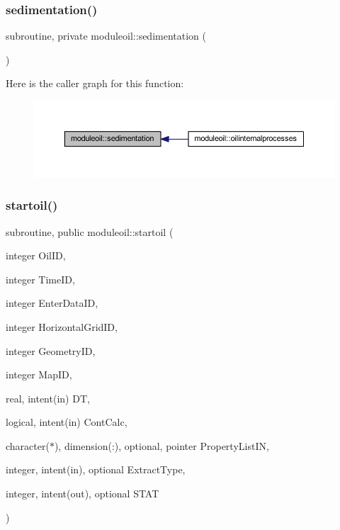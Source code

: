 \mbox{\label{namespacemoduleoil_a9a79912febfdb0e994ca0e98a2f342bc}} 
\subsubsection{\texorpdfstring{sedimentation()}{sedimentation()}}
{\footnotesize\ttfamily subroutine, private moduleoil\+::sedimentation (\begin{DoxyParamCaption}{ }\end{DoxyParamCaption})\hspace{0.3cm}{\ttfamily [private]}}

Here is the caller graph for this function\+:\nopagebreak
\begin{figure}[H]
\begin{center}
\leavevmode
\includegraphics[width=350pt]{namespacemoduleoil_a9a79912febfdb0e994ca0e98a2f342bc_icgraph}
\end{center}
\end{figure}
\mbox{\label{namespacemoduleoil_a65a42d1b037b7effaac748ed9de641b9}} 
\subsubsection{\texorpdfstring{startoil()}{startoil()}}
{\footnotesize\ttfamily subroutine, public moduleoil\+::startoil (\begin{DoxyParamCaption}\item[{integer}]{Oil\+ID,  }\item[{integer}]{Time\+ID,  }\item[{integer}]{Enter\+Data\+ID,  }\item[{integer}]{Horizontal\+Grid\+ID,  }\item[{integer}]{Geometry\+ID,  }\item[{integer}]{Map\+ID,  }\item[{real, intent(in)}]{DT,  }\item[{logical, intent(in)}]{Cont\+Calc,  }\item[{character($\ast$), dimension(\+:), optional, pointer}]{Property\+List\+IN,  }\item[{integer, intent(in), optional}]{Extract\+Type,  }\item[{integer, intent(out), optional}]{S\+T\+AT }\end{DoxyParamCaption})}

